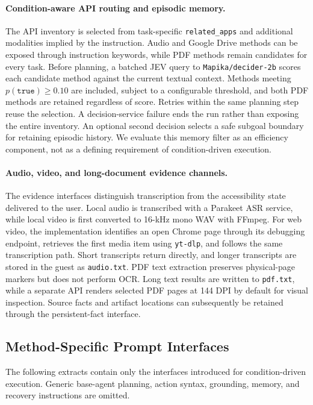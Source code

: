 \documentclass[11pt]{article}
\begin{document}
\paragraph{Condition-aware API routing and episodic memory.}
The API inventory is selected from task-specific \texttt{related\_apps} and additional modalities implied by the instruction. Audio and Google Drive methods can be exposed through instruction keywords, while PDF methods remain candidates for every task. Before planning, a batched JEV query to \texttt{Mapika/decider-2b} \citep{decider2b} scores each candidate method against the current textual context. Methods meeting $p(\texttt{true})\geq 0.10$ are included, subject to a configurable threshold, and both PDF methods are retained regardless of score. Retries within the same planning step reuse the selection. A decision-service failure ends the run rather than exposing the entire inventory. An optional second decision selects a safe subgoal boundary for retaining episodic history. We evaluate this memory filter as an efficiency component, not as a defining requirement of condition-driven execution.

\paragraph{Audio, video, and long-document evidence channels.}
The evidence interfaces distinguish transcription from the accessibility state delivered to the user. Local audio is transcribed with a Parakeet ASR service, while local video is first converted to 16-kHz mono WAV with FFmpeg. For web video, the implementation identifies an open Chrome page through its debugging endpoint, retrieves the first media item using \texttt{yt-dlp}, and follows the same transcription path. Short transcripts return directly, and longer transcripts are stored in the guest as \texttt{audio.txt}. PDF text extraction preserves physical-page markers but does not perform OCR. Long text results are written to \texttt{pdf.txt}, while a separate API renders selected PDF pages at 144 DPI by default for visual inspection. Source facts and artifact locations can subsequently be retained through the persistent-fact interface.

\subsection{Method-Specific Prompt Interfaces}
\label{app:locallstc2-prompts}

The following extracts contain only the interfaces introduced for condition-driven execution. Generic base-agent planning, action syntax, grounding, memory, and recovery instructions are omitted.
\end{document}
